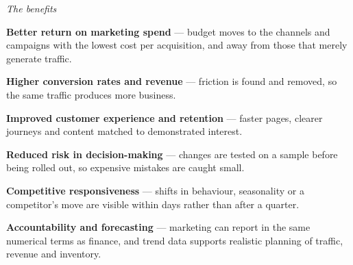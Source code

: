 \begin{qlist}
\textit{The benefits}
\begin{apts}\setcounter{enumi}{7}
\item \textbf{Better return on marketing spend} --- budget moves to the channels
      and campaigns with the lowest cost per acquisition, and away from those
      that merely generate traffic.
\item \textbf{Higher conversion rates and revenue} --- friction is found and
      removed, so the same traffic produces more business.
\item \textbf{Improved customer experience and retention} --- faster pages,
      clearer journeys and content matched to demonstrated interest.
\item \textbf{Reduced risk in decision-making} --- changes are tested on a
      sample before being rolled out, so expensive mistakes are caught small.
\item \textbf{Competitive responsiveness} --- shifts in behaviour, seasonality
      or a competitor's move are visible within days rather than after a
      quarter.
\item \textbf{Accountability and forecasting} --- marketing can report in the
      same numerical terms as finance, and trend data supports realistic
      planning of traffic, revenue and inventory.
\end{apts}


\end{qlist}
